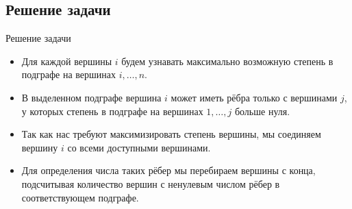 \subsection{Решение задачи}

\begin{frame}[t]{Решение задачи}
\begin{itemize}
    \item Для каждой вершины $i$ будем узнавать максимально возможную степень в подграфе на вершинах $i, \ldots, n$.
    \item В выделенном подграфе вершина $i$ может иметь рёбра только с вершинами $j$, у которых степень в подграфе на вершинах $1, \ldots, j$ больше нуля.
    \item Так как нас требуют максимизировать степень вершины, мы соединяем вершину $i$ со всеми доступными вершинами.
    \item Для определения числа таких рёбер мы перебираем вершины с конца, подсчитывая количество вершин с ненулевым числом рёбер
    в соответствующем подграфе.
\end{itemize}
\end{frame}
